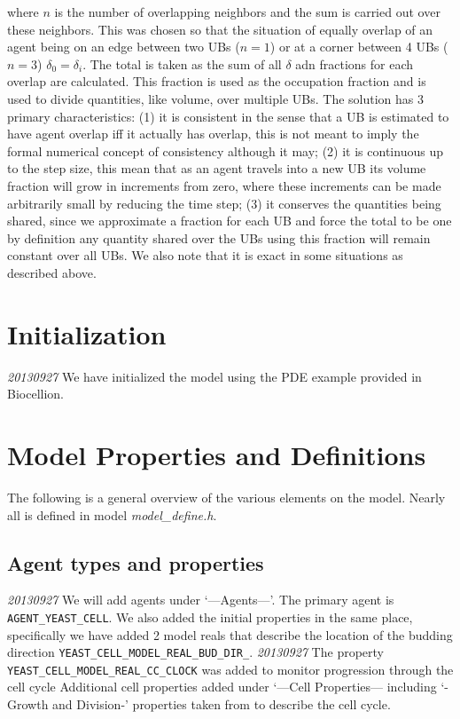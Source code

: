 \documentclass{article}
\begin{document}
where $n$ is the number of overlapping neighbors and the sum is carried out over these neighbors.
This was chosen so that the situation of equally overlap of an agent being on an edge between two UBs ($n=1$) or 
at a corner between 4 UBs ($n=3$) $\delta_0=\delta_i$.
The total is taken as the sum of all $\delta$ adn fractions for each overlap are calculated.
This fraction is used as the occupation fraction and is used to divide quantities, like volume, over multiple UBs.
The solution has 3 primary characteristics: 
(1) it is consistent in the sense that a UB is estimated to have agent overlap iff it actually has overlap,
this is not meant to imply the formal numerical concept of consistency although it may;
(2) it is continuous up to the step size, this mean that as an agent travels into a new UB 
its volume fraction will grow in increments from zero, 
where these increments can be made arbitrarily small by reducing the time step;
(3) it conserves the quantities being shared, 
since we approximate a fraction for each UB and force the total to be one by definition 
any quantity shared over the UBs using this fraction will remain constant over all UBs.
We also note that it is exact in some situations as described above.
 


\section{Initialization}
\emph{20130927} We have initialized the model using the PDE example provided in Biocellion.

\section{Model Properties and Definitions}
The following is a general overview of the various elements on the model.
Nearly all is defined in model \textit{model\_define.h}.

\subsection{Agent types and properties}
\emph{20130927} We will add agents under `---Agents---'.
The primary agent is \texttt{AGENT\_YEAST\_CELL}.
We also added the initial properties in the same place,
specifically we have added 2 model reals that describe the 
location of the budding direction \texttt{YEAST\_CELL\_MODEL\_REAL\_BUD\_DIR\_}.
\emph{20130927} The property \texttt{YEAST\_CELL\_MODEL\_REAL\_CC\_CLOCK}
was added to monitor progression through the cell cycle \cite{Charvin2009}
Additional cell properties added under `---Cell Properties--- including 
`-Growth and Division-' properties taken from \cite{Charvin2009} to describe the cell cycle.
\end{document}
